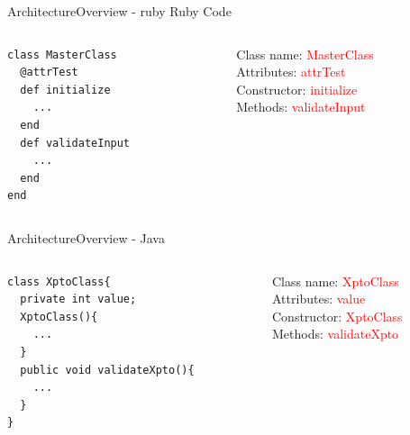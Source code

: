 \documentclass[10pt]{beamer}
\begin{document}
\begin{frame}[fragile]{Architecture}{Overview - ruby}
  Ruby Code
  \begin{columns}
    \begin{column}{0.6\textwidth}
      \small
\begin{lstlisting}
class MasterClass
  @attrTest
  def initialize
    ...
  end
  def validateInput
    ...
  end
end
\end{lstlisting}
    \end{column}

    \begin{column}{0.4\textwidth}
      Class name: \textcolor{red}{MasterClass}\\ \pause
      Attributes: \textcolor{red}{attrTest}\\ \pause
      Constructor: \textcolor{red}{initialize}\\ \pause
      Methods: \textcolor{red}{validateInput}\\
    \end{column}

  \end{columns}
\end{frame}

\begin{frame}[fragile]{Architecture}{Overview - Java}
  \begin{columns}
    \begin{column}{0.6\textwidth}
      \small
\begin{lstlisting}
class XptoClass{
  private int value;
  XptoClass(){
    ...
  }
  public void validateXpto(){
    ...
  }
}
\end{lstlisting}
    \end{column}

    \begin{column}{0.4\textwidth}
      Class name: \textcolor{red}{XptoClass}\\ \pause
      Attributes: \textcolor{red}{value}\\ \pause
      Constructor: \textcolor{red}{XptoClass}\\ \pause
      Methods: \textcolor{red}{validateXpto}\\
    \end{column}

  \end{columns}
\end{frame}
\end{document}
